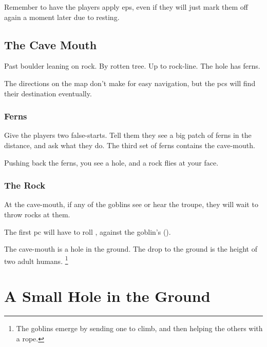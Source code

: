 \begin{multicols}{2}
Remember to have the players apply \glspl{ep}, even if they will just mark them off again a moment later due to resting.

\subsection{The Cave Mouth}

\begin{exampletext}
  Past boulder leaning on rock.
  By rotten tree.
  Up to rock-line.
  The hole has ferns.
\end{exampletext}

The directions on the map don't make for easy navigation, but the \glspl{pc} will find their destination eventually.

\subsubsection{Ferns}
Give the players two false-starts.
Tell them they see a big patch of ferns in the distance, and ask what they do.
The third set of ferns contains the cave-mouth.

\begin{boxtext}
  Pushing back the ferns, you see a hole, and a rock flies at your face.
\end{boxtext}

\subsubsection{The Rock}
At the cave-mouth, if any of the goblins see or hear the troupe, they will wait to throw rocks at them.


The first \gls{pc} will have to roll , against the goblin's  (\tn).

The cave-mouth is a hole in the ground.
The drop to the ground is the height of two adult humans.%
\footnote{The goblins emerge by sending one to climb, and then helping the others with a rope.}

\end{multicols}

\needspace{15em}
\section{A Small Hole in the Ground}

